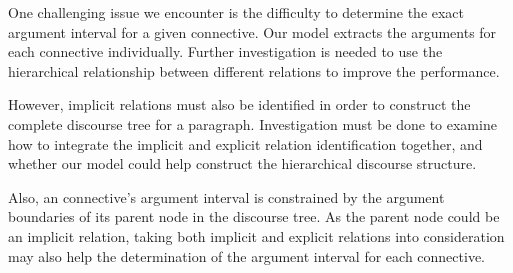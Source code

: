 One challenging issue we encounter is the difficulty to determine
the exact argument interval for a given connective. Our model extracts
the arguments for each connective individually. Further investigation
is needed to use the hierarchical relationship between different
relations to improve the performance.

However, implicit relations must also be identified in order
to construct the complete discourse tree for a paragraph.
Investigation must be done to examine how to integrate the implicit and
explicit relation identification together, and whether our model
could help construct the hierarchical discourse structure.

Also, an connective's argument interval is constrained by the
argument boundaries of its parent node in the discourse tree. As
the parent node could be an implicit relation, taking
both implicit and explicit relations into consideration may also help
the determination of the argument interval for each connective.
